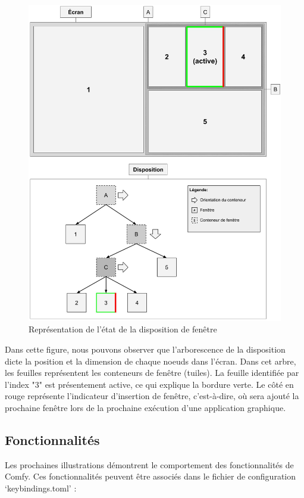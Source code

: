 \documentclass[titlepage]{article}
\begin{document}
\begin{figure}[H]
	\centering
	\includegraphics[width=\textwidth]{diagramme_de_fonctionnement.jpg}
	\caption{Représentation de l'état de la disposition de fenêtre}
\end{figure}

\par
Dans cette figure, nous pouvons observer que l'arborescence de la disposition
dicte la position et la dimension de chaque noeuds dans l'écran. Dans cet arbre, les
feuilles représentent les conteneurs de fenêtre (tuiles). La feuille identifiée
par l'index "3" est présentement active, ce qui explique la bordure verte. Le
côté en rouge représente l'indicateur d'insertion de fenêtre, c'est-à-dire, où
sera ajouté la prochaine fenêtre lors de la prochaine exécution d'une application graphique.

\subsection{Fonctionnalités}
\par
Les prochaines illustrations démontrent le comportement des fonctionnalités de
Comfy. Ces fonctionnalités peuvent être associés dans le fichier de
configuration `keybindings.toml' :
\bigskip
\end{document}
